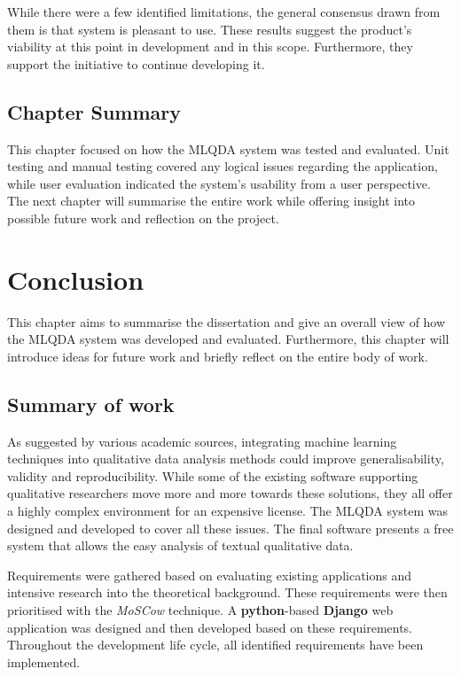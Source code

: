 \documentclass{l4proj}
\begin{document}
While there were a few identified limitations, the general consensus drawn from them is that system is pleasant to use. These results suggest the product's viability at this point in development and in this scope. Furthermore, they support the initiative to continue developing it.

\section{Chapter Summary}
This chapter focused on how the MLQDA system was tested and evaluated. Unit testing and manual testing covered any logical issues regarding the application, while user evaluation indicated the system's usability from a user perspective. The next chapter will summarise the entire work while offering insight into possible future work and reflection on the project.



\chapter{Conclusion}

This chapter aims to summarise the dissertation and give an overall view of how the MLQDA system was developed and evaluated. Furthermore, this chapter will introduce ideas for future work and briefly reflect on the entire body of work.

\section{Summary of work}
As suggested by various academic sources, integrating machine learning techniques into qualitative data analysis methods could improve generalisability, validity and reproducibility. While some of the existing software supporting qualitative researchers move more and more towards these solutions, they all offer a highly complex environment for an expensive license. The MLQDA system was designed and developed to cover all these issues. The final software presents a free system that allows the easy analysis of textual qualitative data.

Requirements were gathered based on evaluating existing applications and intensive research into the theoretical background. These requirements were then prioritised with the \textit{MoSCow} technique. A \textbf{python}-based \textbf{Django} web application was designed and then developed based on these requirements. Throughout the development life cycle, all identified requirements have been implemented. 
\end{document}

